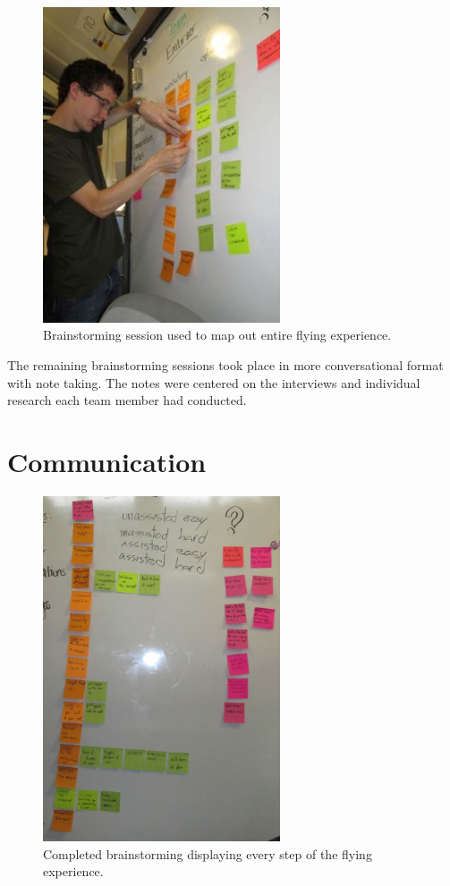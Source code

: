 \begin{figure}[h]
  \centering
     \includegraphics[width=7cm]{images/image018}
   \caption{Brainstorming session used to map out entire flying experience.}
  \label{fig:18}
\end{figure}

The remaining brainstorming sessions took place in more conversational format with note taking.  The notes were centered on the interviews and individual research each team member had conducted.

\section{Communication}
\begin{figure}[h]
  \centering
     \includegraphics[width=7cm]{images/image019}
   \caption{Completed brainstorming displaying every step of the flying experience.}
  \label{fig:19}
\end{figure}

